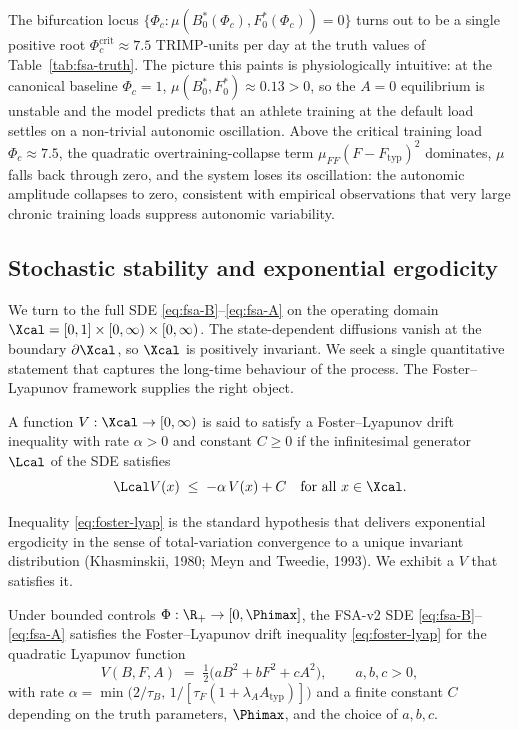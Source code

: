 The bifurcation locus $\{\Phi_c \!:\! \mu(B^*_0(\Phi_c),F^*_0(\Phi_c)) = 0\}$
turns out to be a single positive root
$\Phi_c^{\mathrm{crit}} \approx 7.5$ TRIMP-units per day at the
truth values of Table~\ref{tab:fsa-truth}. The picture this paints
is physiologically intuitive: at the canonical baseline
$\Phi_c = 1$, $\mu(B^*_0,F^*_0) \approx 0.13 > 0$, so the $A=0$
equilibrium is unstable and the model predicts that an athlete
training at the default load settles on a non-trivial autonomic
oscillation. Above the critical training load
$\Phi_c \approx 7.5$, the quadratic overtraining-collapse term
$\mu_{FF}(F-F_{\mathrm{typ}})^2$ dominates, $\mu$ falls back through
zero, and the system loses its oscillation: the autonomic amplitude
collapses to zero, consistent with empirical observations that very
large chronic training loads suppress autonomic variability.

\subsection{Stochastic stability and exponential ergodicity}\label{sec:lyap-stoch}

We turn to the full SDE \eqref{eq:fsa-B}--\eqref{eq:fsa-A} on the
operating domain
$\Xcal = [0,1] \times [0,\infty) \times [0,\infty)$. The
state-dependent diffusions vanish at the boundary $\partial\Xcal$,
so $\Xcal$ is positively invariant. We seek a single quantitative
statement that captures the long-time behaviour of the process. The
Foster--Lyapunov framework supplies the right object.

\begin{definition}\label{def:foster-lyap}
A function $V:\Xcal \to [0,\infty)$ is said to satisfy a
Foster--Lyapunov drift inequality with rate $\alpha > 0$ and
constant $C \ge 0$ if the infinitesimal generator $\Lcal$ of the
SDE satisfies
\begin{equation}
  \Lcal V(x) \;\le\; -\alpha\,V(x) + C
  \quad\text{for all } x \in \Xcal.
  \label{eq:foster-lyap}
\end{equation}
\end{definition}

Inequality \eqref{eq:foster-lyap} is the standard hypothesis that
delivers exponential ergodicity in the sense of total-variation
convergence to a unique invariant distribution
(Khasminskii, 1980; Meyn and Tweedie, 1993). We exhibit a $V$ that
satisfies it.

\begin{theorem}\label{thm:lyap}
Under bounded controls $\Phi:\R_+ \to [0,\Phimax]$, the FSA-v2 SDE
\eqref{eq:fsa-B}--\eqref{eq:fsa-A} satisfies the Foster--Lyapunov
drift inequality \eqref{eq:foster-lyap} for the quadratic Lyapunov
function
\begin{equation}
  V(B,F,A) \;=\; \tfrac{1}{2}\bigl(a B^2 + b F^2 + c A^2\bigr),
  \qquad a,b,c > 0,
  \label{eq:V-quadratic}
\end{equation}
with rate
$\alpha = \min\!\bigl(2/\tau_B,\,1/[\tau_F(1+\lambda_A A_{\mathrm{typ}})]\bigr)$
and a finite constant $C$ depending on the truth parameters,
$\Phimax$, and the choice of $a,b,c$.
\end{theorem}

